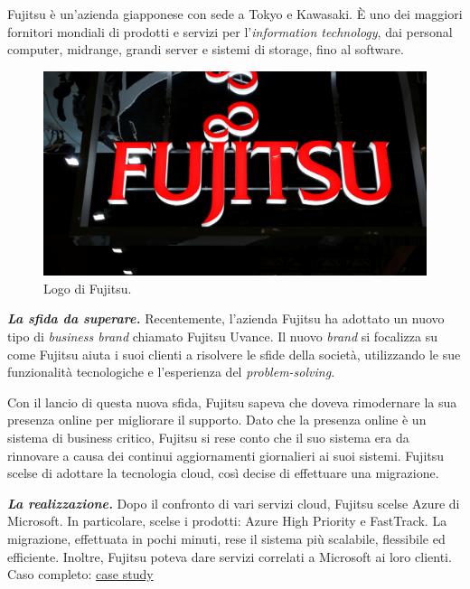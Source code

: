 \documentclass[a4paper]{article}
\begin{document}
	\noindent
	Fujitsu è un'azienda giapponese con sede a Tokyo e Kawasaki. È uno dei maggiori fornitori mondiali di prodotti e servizi per l'\emph{information technology}, dai personal computer, midrange, grandi server e sistemi di storage, fino al software.
	\begin{figure}[!htp]
		\centering
		\includegraphics[width=\textwidth]{img/Fujitsu-1.jpg}
		\caption{Logo di Fujitsu.}
	\end{figure}
	
	\noindent
	\textbf{\emph{La sfida da superare.}} Recentemente, l'azienda Fujitsu ha adottato un nuovo tipo di \emph{business brand} chiamato Fujitsu Uvance. Il nuovo \emph{brand} si focalizza su come Fujitsu aiuta i suoi clienti a risolvere le sfide della società, utilizzando le sue funzionalità tecnologiche e l'esperienza del \emph{problem-solving}.
	
	Con il lancio di questa nuova sfida, Fujitsu sapeva che doveva rimodernare la sua presenza online per migliorare il supporto. Dato che la presenza online è un sistema di business critico, Fujitsu si rese conto che il suo sistema era da rinnovare a causa dei continui aggiornamenti giornalieri ai suoi sistemi. Fujitsu scelse di adottare la tecnologia cloud, così decise di effettuare una migrazione.\newline
	
	\noindent
	\textbf{\emph{La realizzazione.}} Dopo il confronto di vari servizi cloud, Fujitsu scelse Azure di Microsoft. In particolare, scelse i prodotti: Azure High Priority e FastTrack. La migrazione, effettuata in pochi minuti, rese il sistema più scalabile, flessibile ed efficiente. Inoltre, Fujitsu poteva dare servizi correlati a Microsoft ai loro clienti. Caso completo: \href{https://customers.microsoft.com/en-GB/story/1533527200966057333-fujitsu-azure-partner-professional-services-business-critical}{case study}\newpage
	
\end{document}
